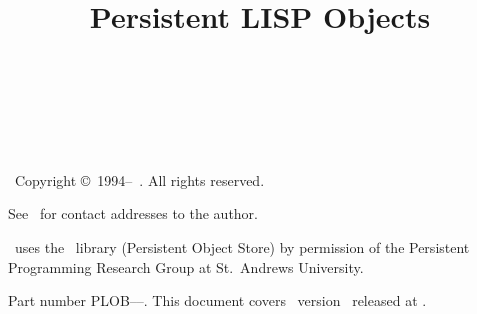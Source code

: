 %

\title{Persistent LISP Objects\\
\plob\\[\bigskipamount]
\thistitle\\[\bigskipamount]}

\maketitle

\clearpage\thispagestyle{empty}

\vspace*{\fill}%
\noindent\plob\ Copyright \copyright\ 1994--\thisyear\ \thisauthor. All
rights reserved.

\vspace*{0.5cm}%
\noindent{}See \ for contact addresses
to the author.

\vspace*{0.5cm}%
\noindent{}\plob\ uses the \postore\ library (Persistent Object Store)
by permission of the Persistent Programming Research Group at St.\ 
Andrews University.

\vspace*{0.5cm}%
\noindent{}Part number PLOB--\thispartnumber--\thisversion. This
document covers \plob\ version \thisversion\ released at \thisdate.

\setcounter{page}{2}\clearpage

